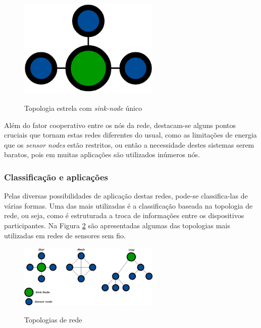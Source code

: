 \documentclass[oneside,openright,12pt]{ufsm_2015} %
\begin{document}
\begin{figure}[ht]
 	    \caption{\label{exepretex} Topologia estrela com \textit{sink-node} único}
    \centering
    \includegraphics[width=0.6\textwidth]{figuras/star_topology.png}
    \vspace{\baselineskip} %
        \label{fig:star-topology}
\end{figure}

Além do fator cooperativo entre os nós da rede, destacam-se alguns pontos cruciais que tornam estas redes diferentes do usual, como as limitações de energia que os \textit{sensor nodes} estão restritos, ou então a necessidade destes sistemas serem baratos, pois em muitas aplicações são utilizados inúmeros nós.

\subsubsection{Classificação e aplicações}
Pelas diversas possibilidades de aplicação destas redes, pode-se classifica-las de várias formas. Uma das mais utilizadas é a classificação baseada na topologia de rede, ou seja, como é estruturada a troca de informações entre os dispositivos participantes. Na Figura \ref{fig:topologias} são apresentadas algumas das topologias mais utilizadas em redes de sensores sem fio. 

\begin{figure}[ht]
 	    \caption{\label{exepretex} Topologias de rede}
    \centering
    \includegraphics[width=0.6\textwidth]{figuras/toplogias.png}
    \vspace{\baselineskip} %
        \label{fig:topologias}
\end{figure}
\end{document}
